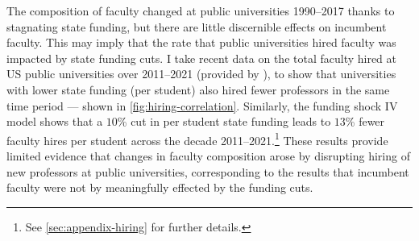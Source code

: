 
The composition of faculty changed at public universities 1990--2017 thanks to stagnating state funding, but there are little discernible effects on incumbent faculty.
This may imply that the rate that public universities hired faculty was impacted by state funding cuts.
I take recent data on the total faculty hired at US public universities over 2011--2021 (provided by \citealt{wapman2022quantifying}), to show that universities with lower state funding (per student) also hired fewer professors in the same time period --- shown in \autoref{fig:hiring-correlation}.
Similarly, the funding shock IV model shows that a $10$\% cut in per student state funding leads to $13$\% fewer faculty hires per student across the decade 2011--2021.\footnote{
    See \autoref{sec:appendix-hiring} for further details.
}
These results provide limited evidence that changes in faculty composition arose by disrupting hiring of new professors at public universities, corresponding to the results that incumbent faculty were not by meaningfully effected by the funding cuts.

